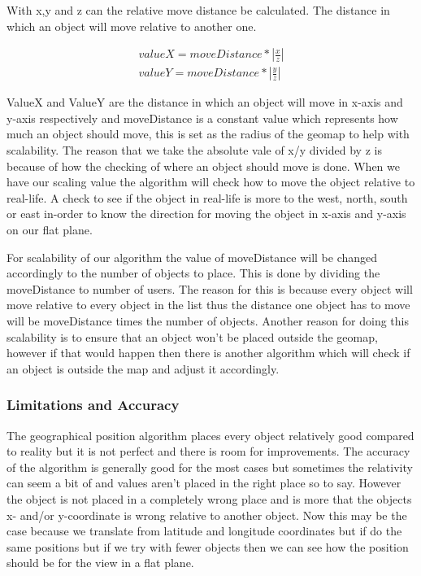 \documentclass[9pt,a4paper]{acmproc}
\begin{document}
With x,y and z can the relative move distance be calculated. The distance in which an object will move relative to another one.

\begin{align*}
\label{eq:2}
valueX = moveDistance*|\frac{x}{z}| \\
valueY = moveDistance*|\frac{y}{z}|
\end{align*}

ValueX and ValueY are the distance in which an object will move in x-axis and y-axis respectively and moveDistance is a constant value which represents how much an object should move, this is set as the radius of the geomap to help with scalability. The reason that we take the absolute vale of x/y divided by z is because of how the checking of where an object should move is done. When we have our scaling value the algorithm will check how to move the object relative to real-life. A check to see if the object in real-life is more to the west, north, south or east in-order to know the direction for moving the object in x-axis and y-axis on our flat plane.

For scalability of our algorithm the value of moveDistance will be changed accordingly to the number of objects to place. This is done by dividing the moveDistance to number of users. The reason for this is because every object will move relative to every object in the list thus the distance one object has to move will be moveDistance times the number of objects. Another reason for doing this scalability is to ensure that an object won't be placed outside the geomap, however if that would happen then there is another algorithm which will check if an object is outside the map and adjust it accordingly.

\subsubsection{Limitations and Accuracy}
The geographical position algorithm places every object relatively good compared to reality but it is not perfect and there is room for improvements. The accuracy of the algorithm is generally good for the most cases but sometimes the relativity can seem a bit of and values aren't placed in the right place so to say. However the object is not placed in a completely wrong place and is more that the objects x- and/or y-coordinate is wrong relative to another object. Now this may be the case because we translate from latitude and longitude coordinates but if do the same positions but if we try with fewer objects then we can see how the position should be for the view in a flat plane.
\end{document}
